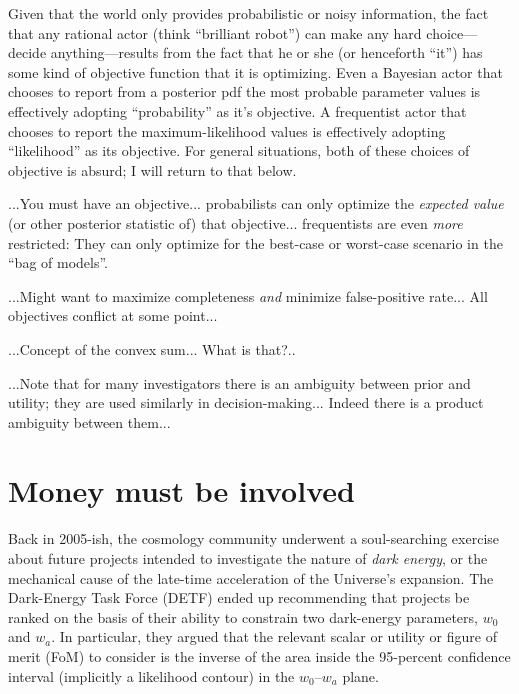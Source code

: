\documentclass[12pt,twoside,pdftex]{article}
\begin{document}
Given that the world only provides probabilistic or noisy information,
the fact that any rational actor (think ``brilliant robot'')  can make any hard choice---decide anything---results
from the fact that he or she (or henceforth ``it'') has some kind of
objective function that it is optimizing.  Even a Bayesian actor that
chooses to report from a posterior pdf the most probable parameter
values is effectively adopting ``probability'' as it's objective.  A
frequentist actor that chooses to report the maximum-likelihood values
is effectively adopting ``likelihood'' as its objective.  For general
situations, both of these choices of objective is absurd; I will
return to that below.

...You must have an objective... probabilists can only optimize the
\emph{expected value} (or other posterior statistic of) that
objective... frequentists are even \emph{more} restricted: They can
only optimize for the best-case or worst-case scenario in the ``bag of
models''.

...Might want to maximize completeness \emph{and} minimize
false-positive rate... All objectives conflict at some point...

...Concept of the convex sum... What is that?..

...Note that for many investigators there is an ambiguity between
prior and utility; they are used similarly in
decision-making... Indeed there is a product ambiguity between them...

\section{Money must be involved}


Back in 2005-ish, the cosmology community underwent a soul-searching
exercise about future projects intended to investigate the nature of
\emph{dark energy}, or the mechanical cause of the late-time
acceleration of the Universe's expansion.  The Dark-Energy Task
Force (DETF) ended up recommending that projects be ranked on the
basis of their ability to constrain two dark-energy parameters, $w_0$
and $w_a$.  In particular, they argued that the relevant scalar or
utility or figure of merit (FoM) to consider is the inverse of the
area inside the 95-percent confidence interval (implicitly a
likelihood contour) in the $w_0$--$w_a$ plane.
\end{document}
